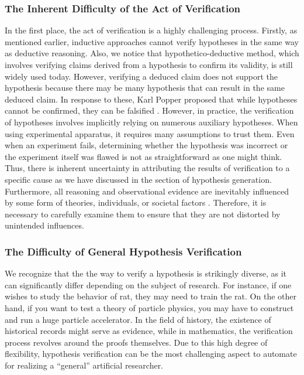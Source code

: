 \subsubsection{The Inherent Difficulty of the Act of Verification}
In the first place, the act of verification is a highly challenging process. Firstly, as mentioned earlier, inductive approaches cannot verify hypotheses in the same way as deductive reasoning. Also, we notice that hypothetico-deductive method, which involves verifying claims derived from a hypothesis to confirm its validity, is still widely used today. However, verifying a deduced claim does not support the hypothesis because there may be many hypothesis that can result in the same deduced claim. In response to these, Karl Popper proposed that while hypotheses cannot be confirmed, they can be falsified \cite{sep-scientific-method}. However, in practice, the verification of hypotheses involves implicitly relying on numerous auxiliary hypotheses. When using experimental apparatus, it requires many assumptions to trust them. Even when an experiment fails, determining whether the hypothesis was incorrect or the experiment itself was flawed is not as straightforward as one might think. Thus, there is inherent uncertainty in attributing the results of verification to a specific cause \cite{chalmers2013thing,sep-physics-experiment,sep-scientific-underdetermination} as we have discussed in the section of hypothesis generation. Furthermore, all reasoning and observational evidence are inevitably influenced by some form of theories, individuals, or societal factors \cite{sep-science-theory-observation}. Therefore, it is necessary to carefully examine them to ensure that they are not distorted by unintended influences. 

\subsubsection{The Difficulty of General Hypothesis Verification}
We recognize that the the way to verify a hypothesis is strikingly diverse, as it can significantly differ depending on the subject of research. For instance, if one wishes to study the behavior of rat, they may need to train the rat. On the other hand, if you want to test a theory of particle physics, you may have to construct and run a huge particle accelerator. In the field of history, the existence of historical records might serve as evidence, while in mathematics, the verification process revolves around the proofs themselves. Due to this high degree of flexibility, hypothesis verification can be the most challenging aspect to automate for realizing a ``general'' artificial researcher.

